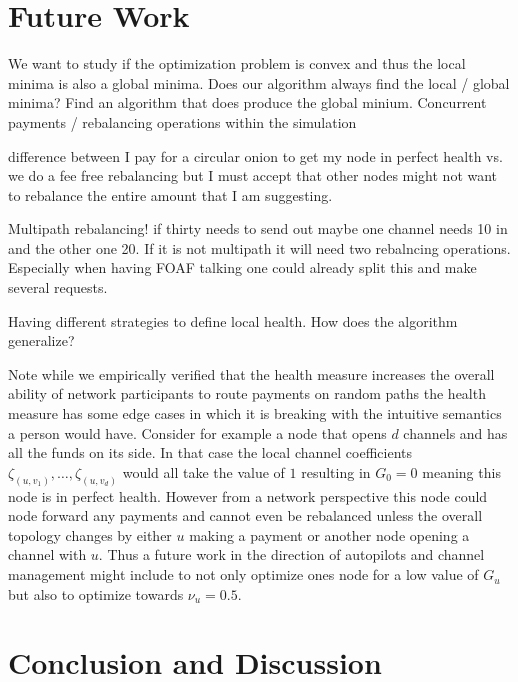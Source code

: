 \documentclass[a4paper]{paper}
\begin{document}


\section{Future Work}
We want to study if the optimization problem is convex and thus the local minima is also a global minima.
Does our algorithm always find the local / global minima?
Find an algorithm that does produce the global minium.
Concurrent payments / rebalancing operations within the simulation

difference between I pay for a circular onion to get my node in perfect health vs. we do a fee free rebalancing but I must accept that other nodes might not want to rebalance the entire amount that I am suggesting.

Multipath rebalancing! if thirty needs to send out maybe one channel needs 10 in and the other one 20. If it is not multipath it will need two rebalncing operations. Especially when having FOAF talking one could already split this and make several requests.

Having different strategies to define local health. How does the algorithm generalize? 

Note while we empirically verified that the health measure increases the overall ability of network participants to route payments on random paths the health measure has some edge cases in which it is breaking with the intuitive semantics a person would have.
Consider for example a node that opens $d$ channels and has all the funds on its side.
In that case the local channel coefficients $\zeta_{(u,v_1)},\dots,\zeta_{(u,v_d)}$ would all take the value of $1$ resulting in $G_0 = 0$ meaning this node is in perfect health.
However from a network perspective this node could node forward any payments and cannot even be rebalanced unless the overall topology changes by either $u$ making a payment or another node opening a channel with $u$.
Thus a future work in the direction of autopilots and channel management might include to not only optimize ones node for a low value of $G_u$ but also to optimize towards $\nu_u = 0.5$.


\section{Conclusion and Discussion}
\end{document}
